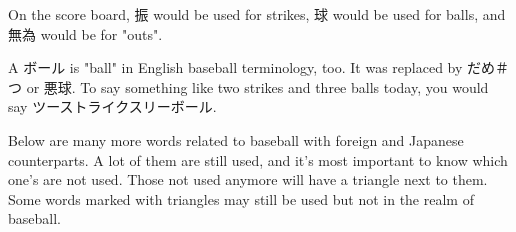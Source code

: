 \par{ On the score board, 振 would be used for strikes, 球 would be used for balls, and 無為 would be for "outs". }

\par{ A ボール is "ball" in English baseball terminology, too. It was replaced by だめ＃つ or 悪球. To say something like two strikes and three balls today, you would say ツーストライクスリーボール. }

\par{ Below are many more words related to baseball with foreign and Japanese counterparts. A lot of them are still used, and it's most important to know which one's are not used. Those not used anymore will have a triangle next to them. Some words marked with triangles may still be used but not in the realm of baseball. }

